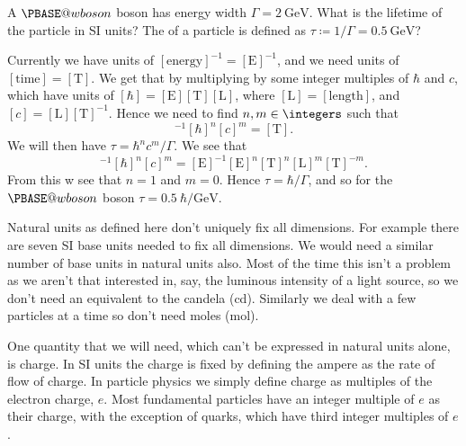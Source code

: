 \documentclass[fleqn]{NotesClass}
\makeatletter
\newcommand{\Pwboson}{\ensuremath{\PBASE@wboson}}
\newcommand{\PW}{\Pwboson}
\makeatother
\begin{document}
    \begin{exm}{}{}
        A \PW{} boson has energy width \(\Gamma = \qty{2}{\giga\electronvolt}\).
        What is the lifetime of the particle in SI units?
        The  of a particle is defined as \(\tau \coloneqq 1/\Gamma = \qty{0.5}{\giga\electronvolt}\)?
        
        Currently we have units of \([\mathrm{energy}]^{-1} = [\mathrm{E}]^{-1}\), and we need units of \([\mathrm{time}] = [\mathrm{T}]\).
        We get that by multiplying by some integer multiples of \(\hbar\) and \(c\), which have units of \([\hbar] = [\mathrm{E}][\mathrm{T}][\mathrm{L}]\), where \([\mathrm{L}] = [\mathrm{length}]\), and \([c] = [\mathrm{L}][\mathrm{T}]^{-1}\).
        Hence we need to find \(n, m \in \integers\) such that
        \begin{equation}
            [\mathrm{E}]^{-1}[\hbar]^{n}[c]^{m} = [\mathrm{T}].
        \end{equation}
        We will then have \(\tau = \hbar^nc^m/\Gamma\).
        We see that
        \begin{equation}
            [\mathrm{E}]^{-1}[\hbar]^{n}[c]^{m} = [\mathrm{E}]^{-1}[\mathrm{E}]^{n}[\mathrm{T}]^{n}[\mathrm{L}]^{m}[\mathrm{T}]^{-m}.
        \end{equation}
        From this w see that
        \(n = 1\) and \(m = 0\).
        Hence \(\tau = \hbar/\Gamma\), and so for the \PW{} boson \(\tau = \qty{0.5}{\hbar\per\giga\electronvolt}\).
    \end{exm}
    
    Natural units as defined here don't uniquely fix all dimensions.
    For example there are seven SI base units needed to fix all dimensions.
    We would need a similar number of base units in natural units also.
    Most of the time this isn't a problem as we aren't that interested in, say, the luminous intensity of a light source, so we don't need an equivalent to the candela (\unit{\candela}).
    Similarly we deal with a few particles at a time so don't need moles (\unit{\mole}).
    
    One quantity that we will need, which can't be expressed in natural units alone, is charge.
    In SI units the charge is fixed by defining the ampere as the rate of flow of charge.
    In particle physics we simply define charge as multiples of the electron charge, \(e\).
    Most fundamental particles have an integer multiple of \(e\) as their charge, with the exception of quarks, which have third integer multiples of \(e\).
    
\end{document}

